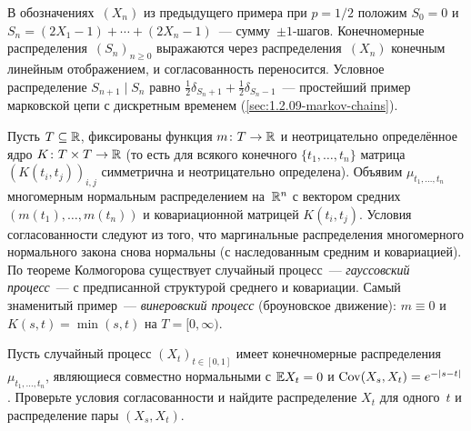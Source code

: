 \begin{example}
\label{ex:simple-rw}
В обозначениях~$ (X_n) $ из предыдущего примера при $p = 1/2$ положим $S_0 = 0$ и $S_n = (2 X_1 - 1) + \cdots + (2 X_n - 1)$~--- сумму~$\pm 1$-шагов. Конечномерные распределения~$(S_n)_{n \geq 0}$ выражаются через распределения~$(X_n)$ конечным линейным отображением, и согласованность переносится. Условное распределение $S_{n+1} \mid S_n$ равно $\frac{1}{2}\delta_{S_n + 1} + \frac{1}{2}\delta_{S_n - 1}$~--- простейший пример марковской цепи с дискретным временем (\cref{sec:1.2.09-markov-chains}).
\end{example}

\begin{example}
\label{ex:gaussian-process}
Пусть $T \subseteq \mathbb{R}$, фиксированы функция $m \colon T \to \mathbb{R}$ и неотрицательно определённое ядро $K \colon T \times T \to \mathbb{R}$ (то есть для всякого конечного $\{t_1, \dots, t_n\}$ матрица $(K(t_i, t_j))_{i, j}$ симметрична и неотрицательно определена). Объявим $\mu_{t_1, \dots, t_n}$ многомерным нормальным распределением на~$\mathbb{R}^n$ с вектором средних $(m(t_1), \dots, m(t_n))$ и ковариационной матрицей $K(t_i, t_j)$. Условия согласованности следуют из того, что маргинальные распределения многомерного нормального закона снова нормальны (с наследованным средним и ковариацией). По теореме Колмогорова существует случайный процесс~--- \emph{гауссовский процесс}~--- с предписанной структурой среднего и ковариации. Самый знаменитый пример~--- \emph{винеровский процесс} (броуновское движение): $m \equiv 0$ и $K(s, t) = \min(s, t)$ на $T = [0, \infty)$.
\end{example}

\begin{problem}
\label{prob:fdd-marginal}
Пусть случайный процесс $(X_t)_{t \in [0, 1]}$ имеет конечномерные распределения $\mu_{t_1, \dots, t_n}$, являющиеся совместно нормальными с $\mathbb{E} X_t = 0$ и $\operatorname{Cov}(X_s, X_t) = e^{-|s - t|}$. Проверьте условия согласованности и найдите распределение $X_t$ для одного~$t$ и распределение пары $(X_s, X_t)$.
\end{problem}

